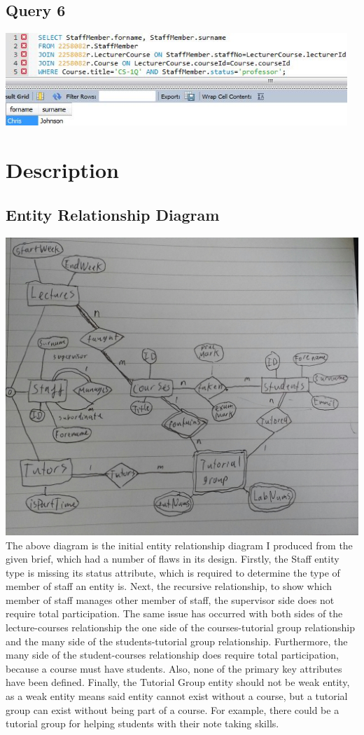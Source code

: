 \documentclass[12pt]{article}
\begin{document}
\subsection{Query 6}
\includegraphics[width=\linewidth,height=3.5cm,keepaspectratio]{query/Query6}

\section{Description}
\subsection{Entity Relationship Diagram}
\includegraphics[width=\linewidth]{ER}
The above diagram is the initial entity relationship diagram I produced from the given brief, which had a number of flaws in its design.
Firstly, the Staff entity type is missing its status attribute, which is required to determine the type of member of staff an entity is.
Next, the recursive relationship, to show which member of staff manages other member of staff, the supervisor side does not require total participation.
The same issue has occurred with both sides of the lecture-courses relationship the one side of the courses-tutorial group relationship and the many side of the students-tutorial group relationship.
Furthermore, the many side of the student-courses relationship does require total participation, because a course must have students.
Also, none of the primary key attributes have been defined.
Finally, the Tutorial Group entity should not be weak entity, as a weak entity means said entity cannot exist without a course, but a tutorial group can exist without being part of a course.
For example, there could be a tutorial group for helping students with their note taking skills.
\end{document}
